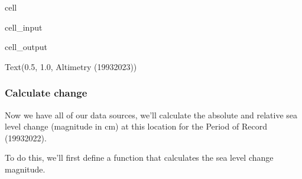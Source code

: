 \documentclass[letterpaper,10pt,english]{jupyterBook}
\begin{document}
\begin{sphinxuseclass}{cell}
\begin{sphinxVerbatimInput}
\begin{sphinxuseclass}{cell_input}
\begin{sphinxVerbatim}[commandchars=\\\{\}]
\PYG{p}{[} \PYG{p}{]}

\end{sphinxVerbatim}

\end{sphinxuseclass}\end{sphinxVerbatimInput}
\begin{sphinxVerbatimOutput}

\begin{sphinxuseclass}{cell_output}
\begin{sphinxVerbatim}[commandchars=\\\{\}]
Text(0.5, 1.0, \PYGZsq{}Altimetry (1993\PYGZhy{}2023)\PYGZsq{})
\end{sphinxVerbatim}

\noindent{}

\end{sphinxuseclass}\end{sphinxVerbatimOutput}

\end{sphinxuseclass}

\subsubsection{Calculate change}
\label{\detokenize{notebooks/regional_and_local/SL_Trend:calculate-change}}
\sphinxAtStartPar
Now we have all of our data sources, we’ll calculate the absolute and relative sea level change (magnitude in cm) at this location for the Period of Record (1993\sphinxhyphen{}2022).

\sphinxAtStartPar
To do this, we’ll first define a function that calculates the sea level change magnitude.
\end{document}
